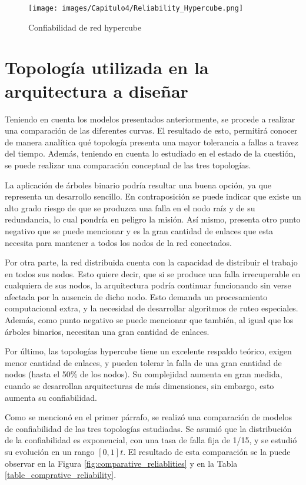 \begin{figure}[H]
 \centering
 \texttt{[image: images/Capitulo4/Reliability\_Hypercube.png]}
  \caption{Confiabilidad de red hypercube}
\label{fig:Reliability_Hypercube}
\end{figure}

\section{Topología utilizada en la arquitectura a diseñar}

Teniendo en cuenta los modelos presentados anteriormente, se procede a realizar una comparación de las diferentes curvas. El resultado de esto, permitirá conocer de manera analítica qué topología presenta una mayor tolerancia a fallas a travez del tiempo. Además, teniendo en cuenta lo estudiado en el estado de la cuestión, se puede realizar una comparación conceptual de las tres topologías.

La aplicación de árboles binario podría resultar una buena opción, ya que representa un desarrollo sencillo. En contraposición se puede indicar que existe un alto grado riesgo de que se produzca una falla en el nodo raíz y de su redundancia, lo cual pondría en peligro la misión. Así mismo, presenta otro punto negativo que se puede mencionar y es la gran cantidad de enlaces que esta necesita para mantener a todos los nodos de la red conectados.

Por otra parte, la red distribuida cuenta con la capacidad de distribuir el trabajo en todos sus nodos. Esto quiere decir, que si se produce una falla irrecuperable en cualquiera de sus nodos, la arquitectura podría continuar funcionando sin verse afectada por la ausencia de dicho nodo. Esto demanda un procesamiento computacional extra, y la necesidad de desarrollar algoritmos de ruteo especiales. Además, como punto negativo se puede mencionar que también, al igual que los árboles binarios, necesitan una gran cantidad de enlaces.

Por último, las topologías hypercube tiene un excelente respaldo teórico, exigen menor cantidad de enlaces, y pueden tolerar la falla de una gran cantidad de nodos (hasta el 50\% de los nodos). Su complejidad aumenta en gran medida, cuando se desarrollan arquitecturas de más dimensiones, sin embargo, esto aumenta su confiabilidad.

Como se mencionó en el primer párrafo, se realizó una comparación de modelos de confiabilidad de las tres topologías estudiadas. Se asumió que la distribución de la confiabilidad es exponencial, con una tasa de falla fija de 1/15, y se estudió su evolución en un rango $[0,1]t$. El resultado de esta comparación se la puede observar en la Figura \ref{fig:comparative_reliablities} y en la Tabla \ref{table_comprative_reliability}.

